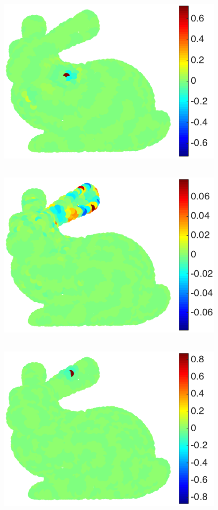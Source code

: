 \documentclass[journal, 10pt]{IEEEtran}
\begin{document}
\begin{figure}[bth]
\begin{minipage}[m]{0.16\linewidth}
\end{minipage}
\begin{minipage}[m]{0.16\linewidth}
\centerline{~~\includegraphics[width=.85\linewidth]{fig_bunny_atom_wav2a}}
\end{minipage}
\begin{minipage}[m]{0.16\linewidth}
\centerline{~~\includegraphics[width=.85\linewidth]{fig_bunny_atom_wav3a}}
\end{minipage}
\begin{minipage}[m]{0.16\linewidth}
\centerline{~~\includegraphics[width=.85\linewidth]{fig_bunny_atom_wav4a}}

\end{minipage}
\end{figure}
\end{document}
